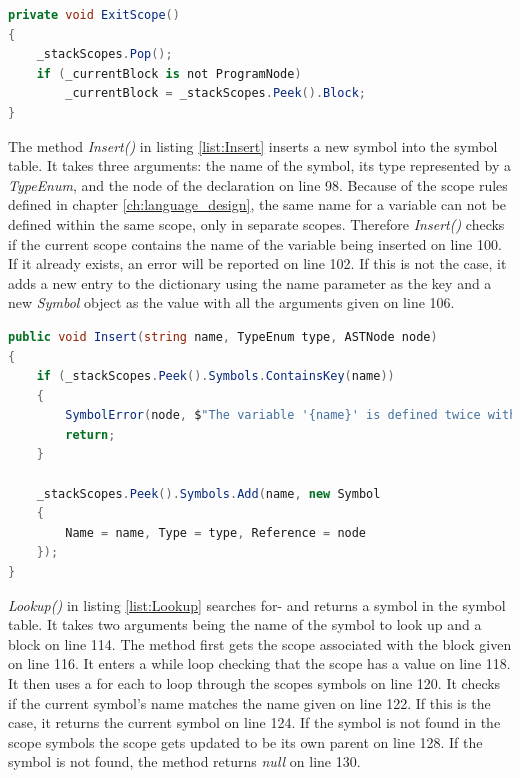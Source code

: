 \begin{lstlisting}[language = csharp, firstnumber=89, label={list:ExitScope},caption=ExitScope() - CobraCompiler/SymbolTable.cs]
private void ExitScope()
{
    _stackScopes.Pop();
    if (_currentBlock is not ProgramNode)
        _currentBlock = _stackScopes.Peek().Block;
}
\end{lstlisting}

\noindent
The method \textit{Insert()} in listing \ref{list:Insert} inserts a new symbol into the symbol table. It takes three arguments: the name of the symbol, its type represented by a \textit{TypeEnum}, and the node of the declaration on line 98. Because of the scope rules defined in chapter \ref{ch:language_design}, the same name for a variable can not be defined within the same scope, only in separate scopes. Therefore \textit{Insert()} checks if the current scope contains the name of the variable being inserted on line 100. If it already exists, an error will be reported on line 102. If this is not the case, it adds a new entry to the dictionary using the name parameter as the key and a new \textit{Symbol} object as the value with all the arguments given on line 106.

\begin{lstlisting}[language = csharp, firstnumber=98, label={list:Insert},caption=Insert() - CobraCompiler/SymbolTable.cs]
public void Insert(string name, TypeEnum type, ASTNode node)
{
    if (_stackScopes.Peek().Symbols.ContainsKey(name))
    {
        SymbolError(node, $"The variable '{name}' is defined twice within the same scope.");
        return;
    }

    _stackScopes.Peek().Symbols.Add(name, new Symbol 
    { 
        Name = name, Type = type, Reference = node
    });
}
\end{lstlisting}

\noindent
\textit{Lookup()} in listing \ref{list:Lookup} searches for- and returns a symbol in the symbol table. It takes two arguments being the name of the symbol to look up and a block on line 114. The method first gets the scope associated with the block given on line 116. It enters a while loop checking that the scope has a value on line 118. It then uses a for each to loop through the scopes symbols on line 120. It checks if the current symbol's name matches the name given on line 122. If this is the case, it returns the current symbol on line 124. If the symbol is not found in the scope symbols the scope gets updated to be its own parent on line 128. If the symbol is not found, the method returns \textit{null} on line 130.\\

